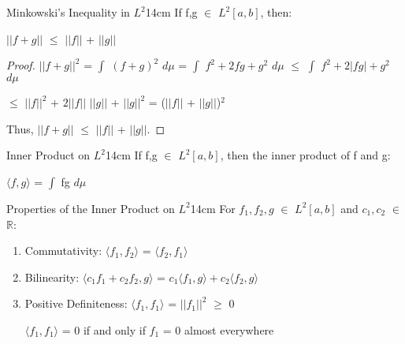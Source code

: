     \vspace{0.5cm}



    \begin{wtheorem}{Minkowski's Inequality in $L^2$}{14cm}
        If f,g $\in$ $L^2[a,b]$, then:

        \hspace{0.5cm}
        $||f+g||$ $\leq$ $||f||$ + $||g||$
    \end{wtheorem}

    \begin{proof}
        $||f+g||^2$
        = $\int$ $(f+g)^2$ $d\mu$
        = $\int$ $f^2 + 2fg + g^2$ $d\mu$
        $\leq$ $\int$ $f^2 + 2|fg| + g^2$ $d\mu$

        \hspace{1.6cm}
        $\leq$ $||f||^2$ + $2||f||$ $||g||$ + $||g||^2$
        = ($||f||$ + $||g||$)$^2$
        
        Thus, $||f+g||$ $\leq$ $||f||$ + $||g||$.
    \end{proof}

    \vspace{0.5cm}



    \begin{definition}{Inner Product on $L^2$}{14cm}
        If f,g $\in$ $L^2[a,b]$, then the {\color{red} inner product}
        of f and g:

        \hspace{0.5cm}
        $\langle f,g \rangle$ = $\int$ fg $d\mu$
    \end{definition}

    \vspace{0.5cm}



    \begin{wtheorem}{Properties of the Inner Product on $L^2$}{14cm}
        For $f_1,f_2,g$ $\in$ $L^2[a,b]$ and $c_1,c_2$ $\in$ $\mathbb{R}$:
    \end{wtheorem}

    \begin{enumerate}[label=(\alph*), leftmargin=2cm, itemsep=0.1cm]
        \item {\color{lblue} Commutativity}:
            $\langle f_1,f_2 \rangle$ = $\langle f_2,f_1 \rangle$

        \item {\color{lblue} Bilinearity}:
            $\langle c_1f_1 + c_2f_2 , g \rangle$
            = $c_1 \langle f_1,g \rangle + c_2 \langle f_2,g \rangle$

        \item {\color{lblue} Positive Definiteness}:
            $\langle f_1,f_1 \rangle$ = $||f_1||^2$ $\geq$ 0

            $\langle f_1,f_1 \rangle$ = 0 if and only if $f_1$ = 0 almost everywhere
    \end{enumerate}

